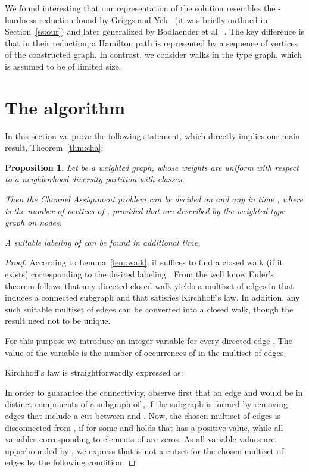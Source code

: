 \documentclass[a4paper,UKenglish]{lipics}
\newcommand{\NP}{{\sf{NP}}\xspace}
\theoremstyle{plain}
\newtheorem{proposition}[theorem]{Proposition}
\theoremstyle{definition}
\begin{document}
{We found interesting that our representation of the solution resembles the \NP-hardness reduction found by Griggs and Yeh~\cite{l:GY92} (it was briefly outlined in Section~\ref{ss:our}) and later generalized by Bodlaender et al.~\cite{l:BKTL00}. 
The key difference is that in their reduction, a Hamilton path is represented by a sequence of vertices of the constructed graph. 
In contrast, we consider walks in the type graph, which is assumed to be of limited size.

 \section{The algorithm}

In this section we prove the following statement, which directly implies our main result, Theorem~\ref{thm:cha}:

\begin{proposition}\label{prop:cha}
Let  be a weighted graph, whose weights are uniform with respect to a 
neighborhood diversity partition with  classes. 

Then the {\sc Channel Assignment} problem can be decided on  and any  in time ,
where  is the number of vertices of , provided that  are described by the weighted type graph  on  nodes.

A suitable labeling of  can be found in additional  time.
\end{proposition}

\begin{proof}
According to Lemma~\ref{lem:walk}, 
it suffices to find a closed walk  (if it exists) corresponding to the desired labeling . 
From the well know Euler's theorem follows that any directed closed walk  yields a multiset of edges in  
that induces a connected subgraph and that satisfies Kirchhoff's law.
In addition, any such suitable multiset of edges can be converted into a 
closed walk, though the result need not to be unique.



For this purpose we introduce an integer variable  for every directed edge .
The value of the variable  is the number of occurrences of  in the multiset of edges.

Kirchhoff's law is straightforwardly expressed as:



In order to guarantee the connectivity, observe first that an edge  and  would be 
in distinct components of a subgraph of ,
if the subgraph is formed by removing edges that include a cut  between  and .
Now, the chosen multiset of edges is disconnected from , if for some  and  holds that 
has a positive value, while all variables corresponding to elements of  are zeros.
As all variable values are upperbounded by , we express that  is not a cutset for the chosen multiset of 
edges by the following condition:




\end{proof}}
\end{document}

